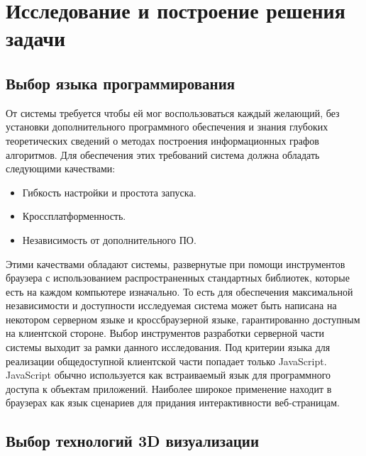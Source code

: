 \section{Исследование и построение решения задачи}
\label{sec:Chapter3} 


\subsection{Выбор языка программирования}

От системы требуется чтобы ей мог воспользоваться каждый желающий, без установки дополнительного программного обеспечения и знания глубоких теоретических сведений о методах построения информационных графов алгоритмов. Для обеспечения этих требований система должна обладать следующими качествами:

\begin{itemize}
    \item Гибкость настройки и простота запуска.
    \item Кроссплатформенность.
    \item Независимость от дополнительного ПО.
\end{itemize}

Этими качествами обладают системы, развернутые при помощи инструментов браузера с использованием распространенных стандартных библиотек, которые есть на каждом компьютере изначально. То есть для обеспечения максимальной независимости и доступности исследуемая система может быть написана на некотором серверном языке и кроссбраузерной языке, гарантированно доступным на клиентской стороне. Выбор инструментов разработки серверной части системы выходит за рамки данного исследования. Под критерии языка для реализации общедоступной клиентской части попадает только JavaScript. JavaScript обычно используется как встраиваемый язык для программного доступа к объектам приложений. Наиболее широкое применение находит в браузерах как язык сценариев для придания интерактивности веб-страницам. \cite{JavaScript_book}

\subsection{Выбор технологий 3D визуализации}

